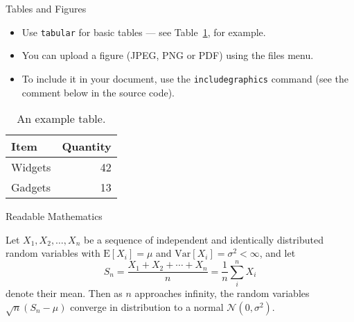 \documentclass{beamer}
\begin{document}
\begin{frame}{Tables and Figures}

\begin{itemize}
\item Use \texttt{tabular} for basic tables --- see Table~\ref{tab:widgets}, for example.
\item You can upload a figure (JPEG, PNG or PDF) using the files menu. 
\item To include it in your document, use the \texttt{includegraphics} command (see the comment below in the source code).
\end{itemize}


\begin{table}
\centering
\begin{tabular}{l|r}
Item & Quantity \\\hline
Widgets & 42 \\
Gadgets & 13
\end{tabular}
\caption{\label{tab:widgets}An example table.}
\end{table}

\end{frame}


\begin{frame}{Readable Mathematics}

Let $X_1, X_2, \ldots, X_n$ be a sequence of independent and identically distributed random variables with $\text{E}[X_i] = \mu$ and $\text{Var}[X_i] = \sigma^2 < \infty$, and let
$$S_n = \frac{X_1 + X_2 + \cdots + X_n}{n}
      = \frac{1}{n}\sum_{i}^{n} X_i$$
denote their mean. Then as $n$ approaches infinity, the random variables $\sqrt{n}(S_n - \mu)$ converge in distribution to a normal $\mathcal{N}(0, \sigma^2)$.

\end{frame}
\end{document}
